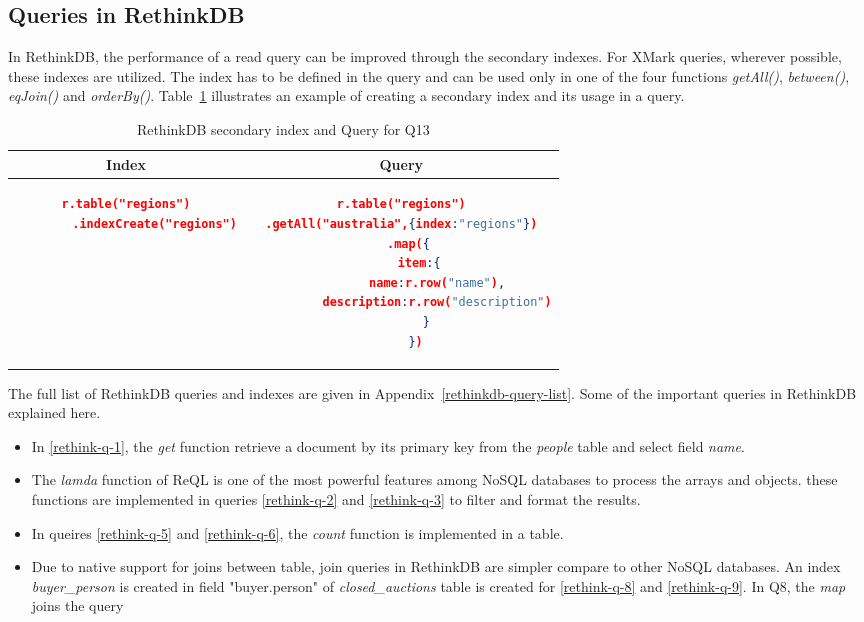 \subsection{Queries in RethinkDB}

In RethinkDB, the performance of a read query can be improved through the secondary indexes. For XMark queries,  wherever possible, these indexes are utilized. The index has to be defined in the query and can be used only in one of the four functions \textit{getAll()}, \textit{between()}, \textit{eqJoin()} and \textit{orderBy()}. Table~\ref{tbl:rethinkdb-index-query} illustrates an example of creating a secondary index and its usage in a query.
\begin{longtable}{c|c}
	\caption{ RethinkDB secondary index and Query for Q13}
	\label{tbl:rethinkdb-index-query}\\
    {Index} & {Query}\\
	\hline
\begin{minipage}{.3\textwidth}
\begin{lstlisting}[language=JSON,basicstyle=\scriptsize]
    r.table("regions")
        .indexCreate("regions")
\end{lstlisting}
\end{minipage} &
\begin{minipage}{.5\textwidth}
\begin{lstlisting}[language=JSON,basicstyle=\scriptsize]
r.table("regions")
.getAll("australia",{index:"regions"})
    .map({  
       item:{  
          name:r.row("name"),
          description:r.row("description")
       }
    })
\end{lstlisting}
\end{minipage}
\end{longtable}
The full list of RethinkDB queries and indexes  are given in Appendix~\ref{rethinkdb-query-list}. 
Some of the important queries in RethinkDB explained here.

\begin{itemize}
\item  In \ref{rethink-q-1}, the \textit{get} function retrieve a document by its primary key from the \textit{people} table  and select field \textit{name}.   

\item  The \textit{lamda} function of ReQL is one of the most powerful features among NoSQL databases to process the arrays and objects. these functions are implemented in  queries \ref{rethink-q-2} and \ref{rethink-q-3} to filter and format the results. 

\item 
 In queires \ref{rethink-q-5} and \ref{rethink-q-6}, the \textit{count} function is implemented in a table. 
 
 \item Due to native support for joins between table, join queries in RethinkDB are simpler compare to other NoSQL databases. An index \textit{buyer\_person} is created in field "buyer.person" of \textit{closed\_auctions} table is created for \ref{rethink-q-8} and \ref{rethink-q-9}. In Q8, the \textit{map} joins the query 

\end{itemize}


